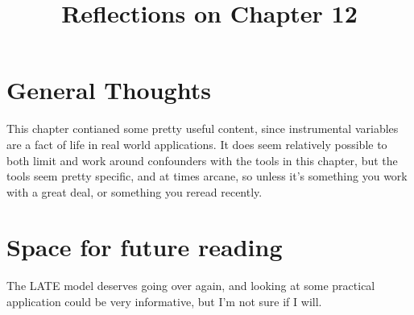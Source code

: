 \documentclass[10pt, english]{article}
\begin{document}
\title{Reflections on Chapter 12}
\date{}
\author{}

\maketitle


\section*{General Thoughts}
This chapter contianed some pretty useful content, since instrumental variables are a fact of 
life in real world applications. It does seem relatively possible to both limit and work around confounders
with the tools in this chapter, but the tools seem pretty specific, and at times arcane, so unless it's something 
you work with a great deal, or something you reread recently. 


\section*{Space for future reading}
The LATE model deserves going over again, and looking at some practical application could be very informative, but
I'm not sure if I will.
\end{document}
